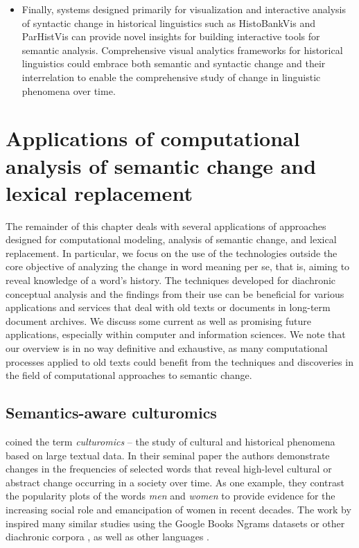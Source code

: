 \documentclass[output=paper%
]{langsci/langscibook}
\begin{document}
\begin{itemize}
\item Finally, systems designed primarily for visualization and interactive analysis of syntactic change in historical linguistics such as HistoBankVis \citep{schatzle:hal-02914284} and ParHistVis \citep{kalouli2019parhistvis} can provide novel insights for building interactive tools for semantic analysis.
Comprehensive visual analytics frameworks for historical linguistics could  embrace both semantic and syntactic change and their interrelation to enable the comprehensive study of change in linguistic phenomena over time. 
\end{itemize}

\section{Applications of computational analysis of semantic change and lexical replacement}
The remainder of this chapter deals with several applications of approaches designed for computational modeling, analysis of semantic change, and lexical replacement. In particular, we focus on the use of the technologies outside  the core objective of analyzing the change in word meaning per se, that is, aiming to reveal knowledge of a word's history.
The techniques developed for diachronic conceptual analysis and the findings from their use can be beneficial for various applications and services that deal with old texts or documents in long-term document archives. We discuss some current as well as promising future applications, especially within computer and information sciences. We note that our overview is in no way definitive and exhaustive, as many computational processes applied to old texts could benefit from the techniques and discoveries in the field of computational approaches to semantic change.

\subsection{Semantics-aware culturomics} \citet{michel2011quantitative} 
coined the term \emph{culturomics} -- the study of cultural and historical phenomena based on large textual data. In their seminal paper the authors
demonstrate changes in the frequencies of selected words that reveal high-level cultural or abstract change occurring in a society over time. As one example, they contrast the popularity plots of the words \emph{men} and \emph{women} to provide evidence for the increasing social role and emancipation of women in recent decades. The work by \citet{michel2011quantitative} inspired many similar studies using the Google Books Ngrams datasets \citep[e.g.][]{acerbi-etal-2013,bentley-etal-2014,pechenick-etal-2015,iliev-etal-2016} or other diachronic corpora \citep[e.g.][]{hills-adelman-2015,snefjella-etal-2018,kutuzov2017tracing}, as well as other languages \citep[e.g.][]{viklund-borin-2016,hengchen2019nation,marjanen2020expansion}.
\end{document}
